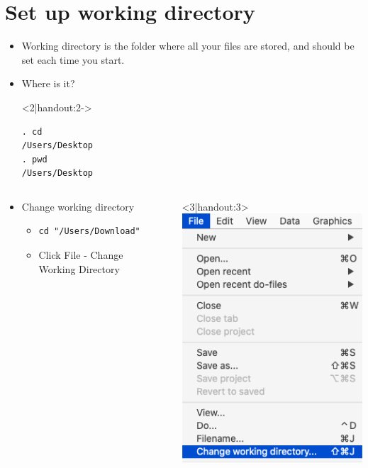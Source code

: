 \section{Set up working directory}
\begin{frame}[fragile]{\secname}
\begin{itemize}
 \item<1|handout:1-> 	Working directory is the folder where all your files are stored, and should be set each time you start.
 \item<2|handout:2->  Where is it?
 \item[]<2|handout:2->  \begin{verbatim}
. cd
/Users/Desktop
. pwd
/Users/Desktop
\end{verbatim}
\end{itemize}
\begin{columns}[]
	\begin{column}{0.60\textwidth}
	\begin{itemize}
	\item<3|handout:3>  Change working directory 
 		 	\begin{itemize}
  	\item \begin{verbatim}
cd "/Users/Download"
\end{verbatim}
  \item Click File - Change Working Directory
\end{itemize}
\end{itemize}
	\end{column}

\begin{column}{040\textwidth}
	\begin{itemize}
	\item[]<3|handout:3> \includegraphics[scale=0.3]{image/cwd}
	
	\end{itemize}
\end{column}
\end{columns}
	

\end{frame}

